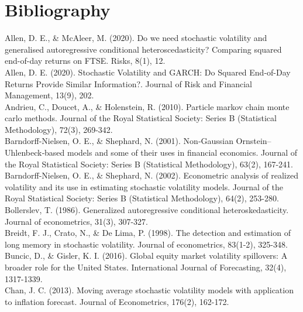\documentclass[
]{book}
\theoremstyle{break}
\theoremstyle{nonumberplain}
\begin{document}
\section{Bibliography}

Allen, D. E., \& McAleer, M. (2020). Do we need stochastic volatility
and generalised autoregressive conditional heteroscedasticity? Comparing
squared end-of-day returns on FTSE. Risks, 8(1), 12.\\

Allen, D. E. (2020). Stochastic Volatility and GARCH: Do Squared
End-of-Day Returns Provide Similar Information?. Journal of Risk and
Financial Management, 13(9), 202.\\

Andrieu, C., Doucet, A., \& Holenstein, R. (2010). Particle markov chain
monte carlo methods. Journal of the Royal Statistical Society: Series B
(Statistical Methodology), 72(3), 269-342.\\

Barndorff‐Nielsen, O. E., \& Shephard, N. (2001). Non‐Gaussian
Ornstein--Uhlenbeck‐based models and some of their uses in financial
economics. Journal of the Royal Statistical Society: Series B
(Statistical Methodology), 63(2), 167-241.\\

Barndorff‐Nielsen, O. E., \& Shephard, N. (2002). Econometric analysis
of realized volatility and its use in estimating stochastic volatility
models. Journal of the Royal Statistical Society: Series B (Statistical
Methodology), 64(2), 253-280.\\

Bollerslev, T. (1986). Generalized autoregressive conditional
heteroskedasticity. Journal of econometrics, 31(3), 307-327.\\

Breidt, F. J., Crato, N., \& De Lima, P. (1998). The detection and
estimation of long memory in stochastic volatility. Journal of
econometrics, 83(1-2), 325-348.\\

Buncic, D., \& Gisler, K. I. (2016). Global equity market volatility
spillovers: A broader role for the United States. International Journal
of Forecasting, 32(4), 1317-1339.\\

Chan, J. C. (2013). Moving average stochastic volatility models with
application to inflation forecast. Journal of Econometrics, 176(2),
162-172.\\
\end{document}
